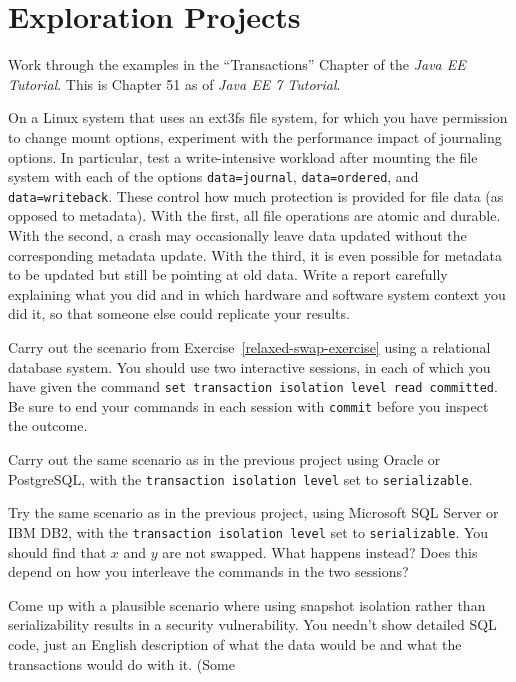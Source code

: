 \section*{Exploration Projects}
\begin{chapterEnumerate}
\item
Work through the examples in the ``Transactions'' Chapter of the
\textit{Java EE Tutorial}. This is Chapter 51 as of \textit{Java EE 7 Tutorial}.
\item
On a Linux system that uses an ext3fs file system, for which you have
permission to change mount options, experiment with the performance
impact of journaling options.  In particular, test a write-intensive
workload after mounting the file system with each of the options
\verb|data=journal|, \verb|data=ordered|, and
\verb|data=writeback|.  These control how much protection is
provided for file data (as opposed to metadata).  With the first, all
file operations are atomic and durable.  With the second, a crash may
occasionally leave data updated without the corresponding metadata
update.  With the third, it is even possible for metadata to be
updated but still be pointing at old data.  
Write a report 
carefully explaining what you did and in which hardware and software
system context you did it, so that someone else could replicate
your results.
\item
Carry out the scenario from Exercise~\ref{relaxed-swap-exercise} using a relational
database system.  You should use two interactive sessions, in each of
which you have given the command {\tt set transaction isolation level
read committed}.  Be sure to end your commands in each session with
{\tt commit} before  you inspect the outcome.
\item
Carry out the same scenario as in the previous project using Oracle
or PostgreSQL, with the {\tt transaction isolation level} set to
{\tt serializable}.
\item
Try the same scenario as in the previous project, using Microsoft SQL
Server or IBM DB2, with the {\tt transaction isolation level} set to
{\tt serializable}.  You should find that $x$ and $y$ are not swapped.  What
happens instead?  Does this depend on how you interleave the commands
in the two sessions?
\item
Come up with a plausible scenario where using snapshot isolation
rather than serializability results in a security vulnerability.  You
needn't show detailed SQL code, just an English description of what
the data would be and what the transactions would do with it.  (Some

\end{chapterEnumerate}
